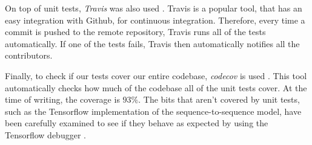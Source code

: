 On top of unit tests, \textit{Travis} was also used \cite{travis}.
Travis is a popular tool, that has an easy integration with Github, for continuous integration.
Therefore, every time a commit is pushed to the remote repository, Travis runs all of the tests automatically.
If one of the tests fails, Travis then automatically notifies all the contributors.

Finally, to check if our tests cover our entire codebase, \textit{codecov} is used \cite{codecov}.
This tool automatically checks how much of the codebase all of the unit tests cover.
At the time of writing, the coverage is $93\%$.
The bits that aren't covered by unit tests, such as the Tensorflow implementation of the sequence-to-sequence model, have been carefully examined to see if they behave as expected by using the Tensorflow debugger \cite{tensorflow}.
